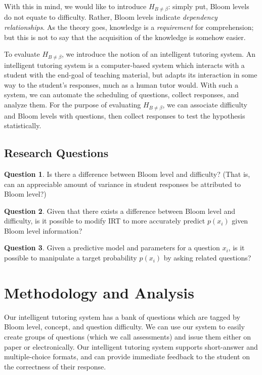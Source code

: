 \documentclass[a4paper,twocolumn]{article}
\begin{document}
With this in mind, we would like to introduce $H_{B\neq\beta}$: simply put,
Bloom levels do not equate to difficulty.  Rather, Bloom levels indicate
\emph{dependency relationships}.  As the theory goes, knowledge is a
\emph{requirement} for comprehension; but this is not to say that the
acquisition of the knowledge is somehow easier.  

To evaluate $H_{B\neq\beta}$, we introduce the notion of an intelligent
tutoring system.  An intelligent tutoring system is a computer-based system
which interacts with a student with the end-goal of teaching material, but
adapts its interaction in some way to the student's responses, much as a human
tutor would.  With such a system, we can automate the scheduling of questions,
collect responses, and analyze them. For the purpose of evaluating
$H_{B\neq\beta}$, we can associate difficulty and Bloom levels with questions,
then collect responses to test the hypothesis statistically.

\subsection{Research Questions}

\textbf{Question 1}. Is there a difference between Bloom level and difficulty?
(That is, can an appreciable amount of variance in student responses be
attributed to Bloom level?)

\textbf{Question 2}. Given that there exists a difference between Bloom level
and difficulty, is it possible to modify IRT to more accurately predict
$p(x_i)$ given Bloom level information?

\textbf{Question 3}. Given a predictive model and parameters for a question
$x_i$, is it possible to manipulate a target probability $p(x_i)$ by asking
related questions?

\section{Methodology and Analysis}

Our intelligent tutoring system has a bank of questions which are tagged by
Bloom level, concept, and question difficulty.  We can use our system to easily
create groups of questions (which we call assessments) and issue them either on
paper or electronically.  Our intelligent tutoring system supports short-answer
and multiple-choice formats, and can provide immediate feedback to the student
on the correctness of their response.
\end{document}
